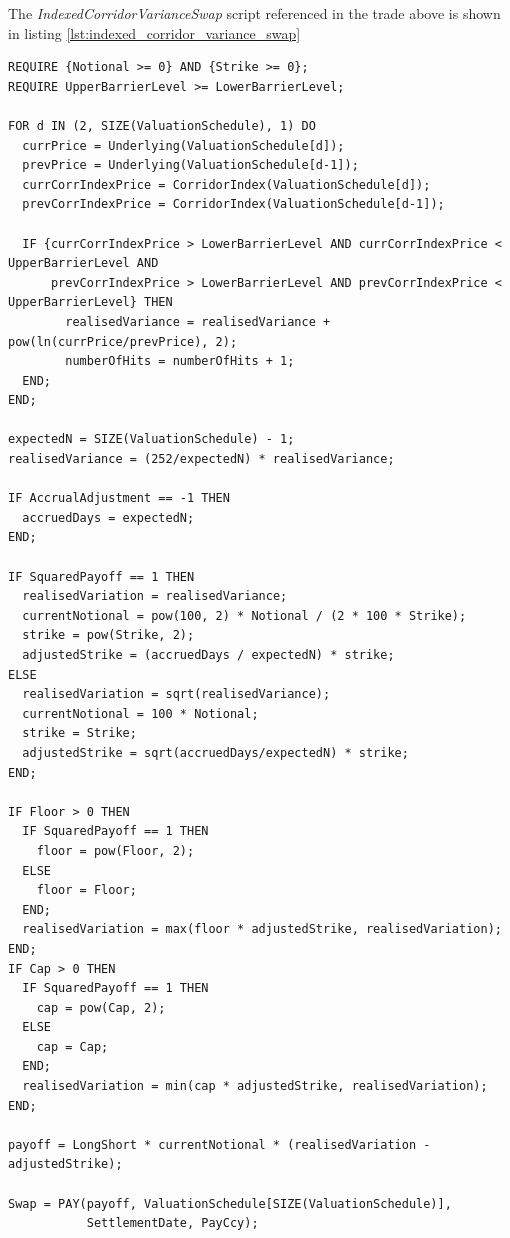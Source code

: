The \emph{IndexedCorridorVarianceSwap} script referenced in the trade above is shown in listing
\ref{lst:indexed_corridor_variance_swap}

\begin{listing}[hbt]
\begin{verbatim}
REQUIRE {Notional >= 0} AND {Strike >= 0};
REQUIRE UpperBarrierLevel >= LowerBarrierLevel;

FOR d IN (2, SIZE(ValuationSchedule), 1) DO
  currPrice = Underlying(ValuationSchedule[d]);
  prevPrice = Underlying(ValuationSchedule[d-1]);
  currCorrIndexPrice = CorridorIndex(ValuationSchedule[d]);
  prevCorrIndexPrice = CorridorIndex(ValuationSchedule[d-1]);

  IF {currCorrIndexPrice > LowerBarrierLevel AND currCorrIndexPrice < UpperBarrierLevel AND
      prevCorrIndexPrice > LowerBarrierLevel AND prevCorrIndexPrice < UpperBarrierLevel} THEN
        realisedVariance = realisedVariance + pow(ln(currPrice/prevPrice), 2);
        numberOfHits = numberOfHits + 1;
  END;
END;

expectedN = SIZE(ValuationSchedule) - 1;
realisedVariance = (252/expectedN) * realisedVariance;

IF AccrualAdjustment == -1 THEN
  accruedDays = expectedN;
END;

IF SquaredPayoff == 1 THEN
  realisedVariation = realisedVariance;
  currentNotional = pow(100, 2) * Notional / (2 * 100 * Strike);
  strike = pow(Strike, 2);
  adjustedStrike = (accruedDays / expectedN) * strike;
ELSE
  realisedVariation = sqrt(realisedVariance);
  currentNotional = 100 * Notional;
  strike = Strike;
  adjustedStrike = sqrt(accruedDays/expectedN) * strike;
END;

IF Floor > 0 THEN
  IF SquaredPayoff == 1 THEN
    floor = pow(Floor, 2);
  ELSE
    floor = Floor;
  END;
  realisedVariation = max(floor * adjustedStrike, realisedVariation);
END;
IF Cap > 0 THEN
  IF SquaredPayoff == 1 THEN
    cap = pow(Cap, 2);
  ELSE
    cap = Cap;
  END;
  realisedVariation = min(cap * adjustedStrike, realisedVariation);
END;

payoff = LongShort * currentNotional * (realisedVariation - adjustedStrike);

Swap = PAY(payoff, ValuationSchedule[SIZE(ValuationSchedule)],
           SettlementDate, PayCcy);
\end{verbatim}
\caption{Payoff script for an IndexedCorridorVarianceSwap.}
\label{lst:indexed_corridor_variance_swap}
\end{listing}

